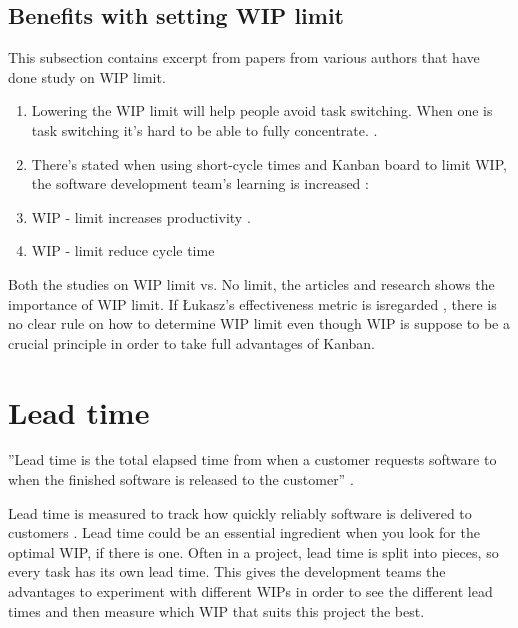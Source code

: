 \documentclass[UKenglish]{ifimaster}  %
\begin{document}
\subsection{Benefits with setting WIP limit}
\label{sub:sub:benefits}
This subsection contains excerpt from papers from various authors that have done study on WIP limit. 

\begin{enumerate}
\item Lowering the WIP limit will help people avoid task switching. When one is task switching it's hard to be able to fully concentrate. \parencite{Ikonen}.
\item There's stated when using short-cycle times and Kanban board to limit WIP, the software development team's learning is increased \parencite{Joyce}:
\item WIP - limit increases productivity \parencite{Joyce}.
\item WIP - limit reduce cycle time \parencite{Ola}

\end{enumerate}

Both the studies on WIP limit vs. No limit, the articles and research shows the importance of WIP limit. If  \L ukasz's effectiveness metric is isregarded , there is no clear rule on how to determine WIP limit even though WIP is suppose to be a crucial principle in order to take full advantages of Kanban.

\section {Lead time}
\label{sec:in:lt}
''Lead time is the total elapsed time from when a customer requests software to when the finished software is released to the customer'' \parencite{Joyce}.

Lead time is measured to track how quickly reliably software is delivered to customers \parencite{Joyce}. Lead time could be an essential ingredient when you look for the optimal WIP, if there is one.  Often in a project, lead time is split into pieces, so every task has its own lead time. This gives the development teams the advantages to experiment with different WIPs in order to see the different lead times and then measure which WIP that suits this project the best. 
\end{document}
